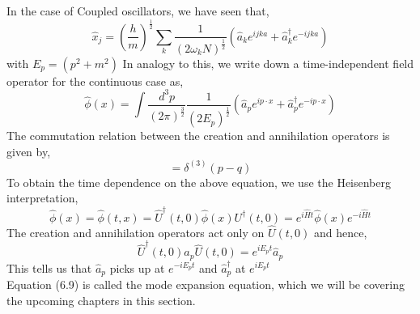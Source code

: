  In the case of Coupled oscillators, we have seen that, 
 \begin{equation}
     \hat{x}_{j} = (\frac{h}{m})^{\frac{1}{2}} \sum_{k} \frac{1}{(2 \omega_{k} N )^{\frac{1}{2}}} (\hat{a}_{k}e^{ijka} + \hat{a}^{\dagger}_{k}e^{-ijka}) 
 \end{equation}
 with $E_{p}= (p^{2}+m^{2})$
 In analogy to this, we write down a time-independent field operator for the continuous case as, 
 \begin{equation}
     \hat{\phi}(x) = \int\frac{d^{3}p}{(2\pi)^{\frac{3}{2}}} \frac{1}{(2 E_{p})^{\frac{1}{2}}} (\hat{a}_{p}e^{ip \cdot x} + \hat{a}^{\dagger}_{p}e^{-ip \cdot x})
 \end{equation}
 The commutation relation between the creation and annihilation operators is given by, 
 \begin{equation}
     [\hat{a}_{p}, \hat{a}^{\dagger}_{q}] = \delta^{(3)}(p-q)
 \end{equation}
 To obtain the time dependence on the above equation, we use the Heisenberg interpretation, 
 \begin{equation}
     \hat{\phi}(x) = \hat{\phi}(t,x) = \hat{U}^{\dagger}(t,0) \hat{\phi}(x) {U}^{\dagger}(t,0) = e^{i \hat{H}t} \hat{\phi}(x) e^{-i \hat{H}t}
 \end{equation}
 The creation and annihilation operators act only on $\hat{U}(t,0)$ and hence, 
 \begin{equation}
     \hat{U}^{\dagger}(t,0) a_{p} \hat{U}(t,0) = e^{iE_{p}t} \hat{a}_{p}
 \end{equation}
 This tells us that $\hat{a}_{p}$ picks up at $ e^{-iE_{p}t}$ and $\hat{a}^{\dagger}_{p}$ at $ e^{iE_{p}t}$ \\
 Equation (6.9) is called the mode expansion equation, which we will be covering the upcoming chapters in this section.
